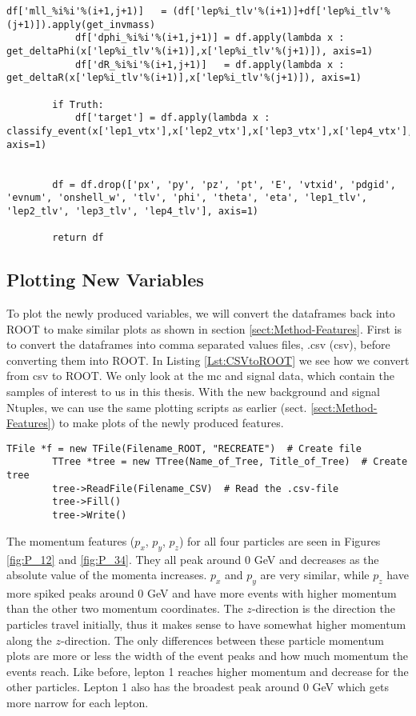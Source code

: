 \documentclass[a4paper, american, 12pt]{report}
\begin{document}
\begin{lstlisting}[caption=Making new variables., label=Lst:Making_variables]
			df['mll_%i%i'%(i+1,j+1)]   = (df['lep%i_tlv'%(i+1)]+df['lep%i_tlv'%(j+1)]).apply(get_invmass)
			df['dphi_%i%i'%(i+1,j+1)] = df.apply(lambda x : get_deltaPhi(x['lep%i_tlv'%(i+1)],x['lep%i_tlv'%(j+1)]), axis=1)
			df['dR_%i%i'%(i+1,j+1)]   = df.apply(lambda x : get_deltaR(x['lep%i_tlv'%(i+1)],x['lep%i_tlv'%(j+1)]), axis=1)
		
		if Truth:
			df['target'] = df.apply(lambda x : classify_event(x['lep1_vtx'],x['lep2_vtx'],x['lep3_vtx'],x['lep4_vtx'],x['lep1_pid'],x['lep2_pid'],x['lep3_pid'],x['lep4_pid']), axis=1)
		
		
		df = df.drop(['px', 'py', 'pz', 'pt', 'E', 'vtxid', 'pdgid', 'evnum', 'onshell_w', 'tlv', 'phi', 'theta', 'eta', 'lep1_tlv', 'lep2_tlv', 'lep3_tlv', 'lep4_tlv'], axis=1)
		
		return df
	\end{lstlisting}
	
	
	\subsection{Plotting New Variables}
	\label{subsect:Method-PlottingVariables}
	To plot the newly produced variables, we will convert the dataframes back into ROOT to make similar plots as shown in section \ref{sect:Method-Features}. First is to convert the dataframes into comma separated values files, .csv (\acrshort{csv}), before converting them into ROOT. In Listing \ref{Lst:CSVtoROOT} we see how we convert from \acrshort{csv} to ROOT. We only look at the \acrshort{mc} and signal data, which contain the samples of interest to us in this thesis. With the new background and signal Ntuples, we can use the same plotting scripts as earlier (sect. \ref{sect:Method-Features}) to make plots of the newly produced features. 
	\begin{lstlisting}[caption=Convert from CSV to ROOT., label=Lst:CSVtoROOT]
		TFile *f = new TFile(Filename_ROOT, "RECREATE")  # Create file
		TTree *tree = new TTree(Name_of_Tree, Title_of_Tree)  # Create tree
		tree->ReadFile(Filename_CSV)  # Read the .csv-file
		tree->Fill()
		tree->Write()
	\end{lstlisting}
	
	The momentum features ($p_x$, $p_y$, $p_z$) for all four particles are seen in Figures \ref{fig:P_12} and \ref{fig:P_34}. They all peak around 0 GeV and decreases as the absolute value of the momenta increases. $p_x$ and $p_y$ are very similar, while $p_z$ have more spiked peaks around 0 GeV and have more events with higher momentum than the other two momentum coordinates. The $z$-direction is the direction the particles travel initially, thus it makes sense to have somewhat higher momentum along the $z$-direction. The only differences between these particle momentum plots are more or less the width of the event peaks and how much momentum the events reach. Like before, lepton 1 reaches higher momentum and decrease for the other particles. Lepton 1 also has the broadest peak around 0 GeV which gets more narrow for each lepton.
	
\end{document}
